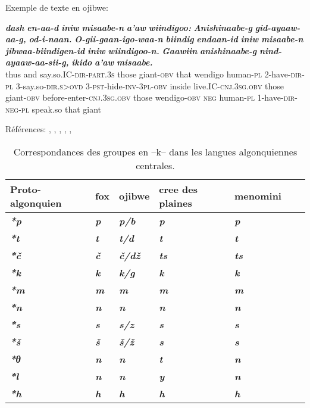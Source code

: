 \documentclass[twoside,a4paper,11pt]{article}
\newcommand{\ipa}[1]{{\phon\textbf{\textit{#1}}}}
\newcommand{\Σ}{\greek{Σ}}
\begin{document}
Exemple de texte en ojibwe:

\begin{exe} 
 \ex 
\gll    \ipa{Mii} 	\ipa{dash} 	\ipa{en-aa-d} 	\ipa{iniw} 	\ipa{misaabe-n} 	\ipa{a'aw} 	\ipa{wiindigoo:} 	\ipa{Anishinaabe-g} \ipa{gid-ayaaw-aa-g,} 	\ipa{od-i-naan.} 	\ipa{O-gii-gaan-igo-waa-n} 	\ipa{biindig} 	\ipa{endaan-id} 	\ipa{iniw} 	\ipa{misaabe-n} 	\ipa{jibwaa-biindigen-id} 	\ipa{iniw} 	\ipa{wiindigoo-n.} 	\ipa{Gaawiin} 	\ipa{anishinaabe-g} 	\ipa{nind-ayaaw-aa-sii-g,} 	\ipa{ikido} 	\ipa{a'aw} 	\ipa{misaabe.}  \\ 
      thus and  say.so.IC-\textsc{dir}-\textsc{part}.3\textsc{s} those giant-\textsc{obv}  that  wendigo    human-\textsc{pl}    2-have-\textsc{dir}-\textsc{pl}    3-say.so-\textsc{dir}.\textsc{s}>\textsc{ovd}  3-\textsc{pst}-hide-\textsc{inv}-3\textsc{pl}-\textsc{obv} inside  live.IC-\textsc{cnj}.3\textsc{sg}.\textsc{obv} those giant-\textsc{obv}  before-enter-\textsc{cnj}.3\textsc{sg}.\textsc{obv} those wendigo-\textsc{obv}  \textsc{neg}     human-\textsc{pl} 1-have-\textsc{dir}-\textsc{neg}-\textsc{pl}    speak.so that giant \\ 
\end{exe} 
 
 


Références: 
\citet{bloomfield25central}, \citet{bloomfield28thk}, \citet{bloomfield46proto}, \citet{siebert41clusters}, \citet{goddard74arapaho}, \citet{jacques13arapaho}
 
 
\begin{table}[h]
\caption{Correspondances des groupes en --k-- dans les langues algonquiennes centrales.} \centering  \label{tab:c.simple}
\begin{tabular}{lllllll}
\toprule
Proto-algonquien & fox & ojibwe & cree des plaines & menomini \\
\midrule
\ipa{*p} & 	\ipa{p} & 	\ipa{p/b} & 	\ipa{p} & 	\ipa{p} & 	\\
\ipa{*t} & 	\ipa{t} & 	\ipa{t/d} & 	\ipa{t} & 	\ipa{t} & 	\\
\ipa{*č} & 	\ipa{č} & 	\ipa{č/dž} & 	\ipa{ts} & 	\ipa{ts} & 	\\
\ipa{*k} & 	\ipa{k} & 	\ipa{k/g} & 	\ipa{k} & 	\ipa{k} & 	\\
\ipa{*m} & 	\ipa{m} & 	\ipa{m} & 	\ipa{m} & 	\ipa{m} & 	\\
\ipa{*n} & 	\ipa{n} & 	\ipa{n} & 	\ipa{n} & 	\ipa{n} & 	\\
\ipa{*s} & 	\ipa{s} & 	\ipa{s/z} & 	\ipa{s} & 	\ipa{s} & 	\\
\ipa{*š} & 	\ipa{š} & 	\ipa{š/ž} & 	\ipa{s} & 	\ipa{s} & 	\\
\ipa{*θ} & 	\ipa{n} & 	\ipa{n} & 	\ipa{t} & 	\ipa{n} & 	\\
\ipa{*l} & 	\ipa{n} & 	\ipa{n} & 	\ipa{y} & 	\ipa{n} & 	\\
\ipa{*h} & 	\ipa{h} & 	\ipa{h} & 	\ipa{h} & 	\ipa{h} & 	\\
\bottomrule
\end{tabular}
\end{table}
\end{document}
